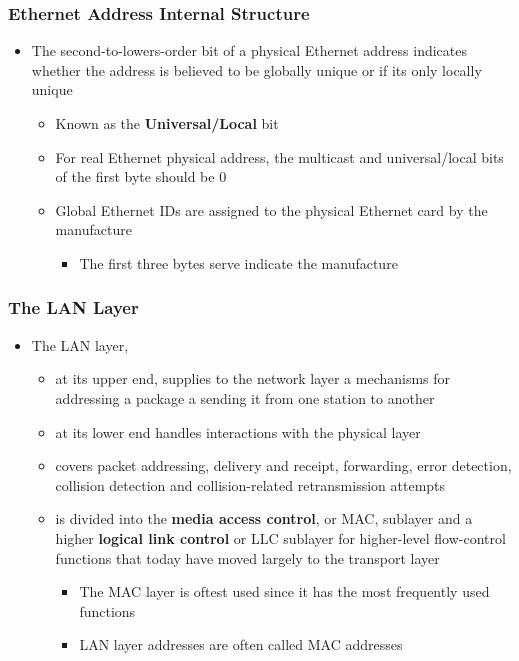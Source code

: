 \documentclass[11pt]{article}
\providecommand{\tightlist}{%
      \setlength{\itemsep}{0pt}\setlength{\parskip}{0pt}}
\begin{document}
    \subsubsection{Ethernet Address Internal
Structure}\label{ethernet-address-internal-structure}

\begin{itemize}
\tightlist
\item
  The second-to-lowers-order bit of a physical Ethernet address
  indicates whether the address is believed to be globally unique or if
  its only locally unique

  \begin{itemize}
  \tightlist
  \item
    Known as the \textbf{Universal/Local} bit
  \item
    For real Ethernet physical address, the multicast and
    universal/local bits of the first byte should be 0
  \item
    Global Ethernet IDs are assigned to the physical Ethernet card by
    the manufacture

    \begin{itemize}
    \tightlist
    \item
      The first three bytes serve indicate the manufacture
    \end{itemize}
  \end{itemize}
\end{itemize}

    \subsubsection{The LAN Layer}\label{the-lan-layer}

\begin{itemize}
\tightlist
\item
  The LAN layer,

  \begin{itemize}
  \tightlist
  \item
    at its upper end, supplies to the network layer a mechanisms for
    addressing a package a sending it from one station to another
  \item
    at its lower end handles interactions with the physical layer
  \item
    covers packet addressing, delivery and receipt, forwarding, error
    detection, collision detection and collision-related retransmission
    attempts
  \item
    is divided into the \textbf{media access control}, or MAC, sublayer
    and a higher \textbf{logical link control} or LLC sublayer for
    higher-level flow-control functions that today have moved largely to
    the transport layer

    \begin{itemize}
    \tightlist
    \item
      The MAC layer is oftest used since it has the most frequently used
      functions
    \item
      LAN layer addresses are often called MAC addresses
    \end{itemize}
  \end{itemize}
\end{itemize}
\end{document}
